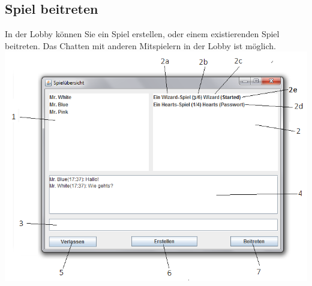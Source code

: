 \documentclass[titlepage,10pt,a4paper]{article}
\begin{document}
\subsection{Spiel beitreten}
In der \gls{Lobby} können Sie ein Spiel erstellen, oder einem existierenden Spiel beitreten. Das Chatten mit anderen Mitspielern in der \gls{Lobby} ist möglich.\\
\includegraphics[width=\textwidth]{Lobby-Fenster}
\end{document}
